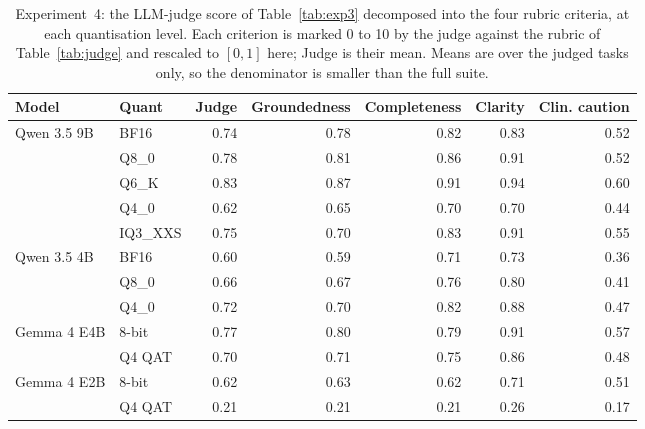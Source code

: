 \begin{table}[H]
\centering
\caption{Experiment~4: the LLM-judge score of Table~\ref{tab:exp3} decomposed into the four rubric criteria, at each quantisation level. Each criterion is marked 0 to 10 by the judge against the rubric of Table~\ref{tab:judge} and rescaled to $[0,1]$ here; Judge is their mean. Means are over the judged tasks only, so the denominator is smaller than the full suite.}
\label{tab:exp3_judge}
\small
\setlength{\tabcolsep}{5pt}
\begin{tabular}{@{}ll rrrrr@{}}
\toprule
Model & Quant & Judge & Groundedness & Completeness & Clarity & Clin. caution \\
\midrule
Qwen 3.5 9B & BF16 & 0.74 & 0.78 & 0.82 & 0.83 & 0.52 \\
 & Q8\_0 & 0.78 & 0.81 & 0.86 & 0.91 & 0.52 \\
 & Q6\_K & 0.83 & 0.87 & 0.91 & 0.94 & 0.60 \\
 & Q4\_0 & 0.62 & 0.65 & 0.70 & 0.70 & 0.44 \\
 & IQ3\_XXS & 0.75 & 0.70 & 0.83 & 0.91 & 0.55 \\
\midrule
Qwen 3.5 4B & BF16 & 0.60 & 0.59 & 0.71 & 0.73 & 0.36 \\
 & Q8\_0 & 0.66 & 0.67 & 0.76 & 0.80 & 0.41 \\
 & Q4\_0 & 0.72 & 0.70 & 0.82 & 0.88 & 0.47 \\
\midrule
Gemma 4 E4B & 8-bit & 0.77 & 0.80 & 0.79 & 0.91 & 0.57 \\
 & Q4 QAT & 0.70 & 0.71 & 0.75 & 0.86 & 0.48 \\
\midrule
Gemma 4 E2B & 8-bit & 0.62 & 0.63 & 0.62 & 0.71 & 0.51 \\
 & Q4 QAT & 0.21 & 0.21 & 0.21 & 0.26 & 0.17 \\
\bottomrule
\end{tabular}
\end{table}
